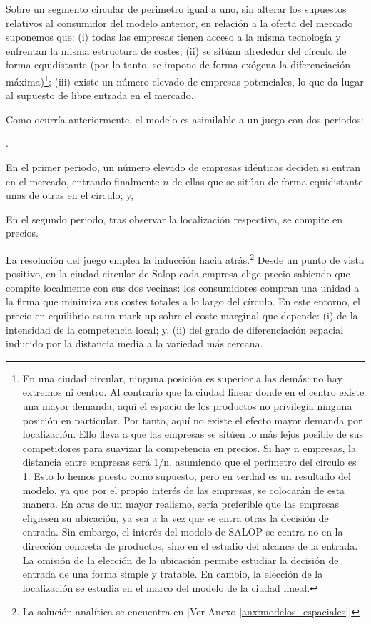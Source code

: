 \documentclass[10pt,a4paper]{article}
\newcounter{numitem}
\newenvironment{lnum}
      {\begin{list}{\arabic{numitem}.}{%
          \usecounter{numitem}%
          \setlength{\leftmargin}{1cm}%
          \setlength{\parskip}{3pt}%
          \setlength{\itemsep}{0pt}%
          \setlength{\parsep}{0pt}%
      }}
      {\end{list}}
\newcommand{\authorfont}[1]{{\fontfamily{EBGaramond-TLF}\selectfont #1}}
\begin{document}
Sobre un segmento circular de perimetro igual a uno, sin alterar los supuestos relativos al consumidor del modelo anterior, en relación a la oferta del mercado suponemos que: (i) todas las empresas tienen acceso a la misma tecnología y enfrentan la misma estructura de costes; (ii) se sitúan alrededor del círculo de forma equidistante (por lo tanto, se impone de forma exógena la diferenciación máxima)\footnote{%
    En una ciudad circular, ninguna posición es superior a las demás: no hay extremos ni centro. Al contrario que la ciudad linear donde en el centro existe una mayor demanda, aquí el espacio de los productos no privilegia ninguna posición en particular. Por tanto, aquí no existe el efecto mayor demanda por localización. Ello lleva a que las empresas se sitúen lo más lejos posible de sus competidores para suavizar la competencia en precios. Si hay n empresas, la distancia entre empresas será 1/n, asumiendo que el perímetro del círculo es 1. Esto lo hemos puesto como supuesto, pero en verdad es un resultado del modelo, ya que por el propio interés de las empresas, se colocarán de esta manera. En aras de un mayor realismo, sería preferible que las empresas eligiesen su ubicación, ya sea a la vez que se entra otras la decisión de entrada. Sin embargo, el interés del modelo de SALOP se centra no en la dirección concreta de productos, sino en el estudio del alcance de la entrada. La omisión de la elección de la ubicación permite estudiar la decisión de entrada de una forma simple y tratable. En cambio, la elección de la localización se estudia en el marco del modelo de la ciudad lineal.
}; (iii) existe un número elevado de empresas potenciales, lo que da lugar al supuesto de libre entrada en el mercado.

Como ocurría anteriormente, el modelo es asimilable a un juego con dos periodos: 
\begin{lnum}
    \item En el primer periodo, un número elevado de empresas idénticas deciden si entran en el mercado, entrando finalmente $n$ de ellas que se sitúan de forma equidistante unas de otras en el círculo; y,
    \item En el segundo periodo, tras observar la localización respectiva, se compite en precios.
\end{lnum}

La resolución del juego emplea la inducción hacia atrás.\footnote{%
    La solución analítica se encuentra en [\authorfont{Ver Anexo \ref{anx:modelos_espaciales}}]
} Desde un punto de vista positivo, en la ciudad circular de Salop cada empresa elige precio sabiendo que compite localmente con sus dos vecinas: los consumidores compran una unidad a la firma que minimiza sus costes totales a lo largo del círculo. En este entorno, el precio en equilibrio es un mark-up sobre el coste marginal que depende: (i) de la intensidad de la competencia local; y, (ii) del grado de diferenciación espacial inducido por la distancia media a la variedad más cercana. 
\end{document}

